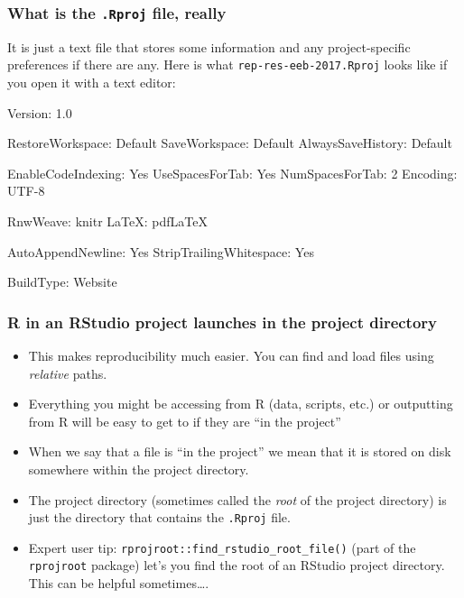 \documentclass[]{book}
\newenvironment{Shaded}{\begin{snugshade}}{\end{snugshade}}
\newcommand{\FunctionTok}[1]{\textcolor[rgb]{0.00,0.00,0.00}{{#1}}}
\newcommand{\NormalTok}[1]{{#1}}
\providecommand{\tightlist}{%
  \setlength{\itemsep}{0pt}\setlength{\parskip}{0pt}}
\theoremstyle{definition}
\theoremstyle{definition}
\theoremstyle{remark}
\begin{document}
\subsubsection{\texorpdfstring{What is the \texttt{.Rproj} file,
really}{What is the .Rproj file, really}}\label{what-is-the-.rproj-file-really}

It is just a text file that stores some information and any
project-specific preferences if there are any. Here is what
\texttt{rep-res-eeb-2017.Rproj} looks like if you open it with a text
editor:

\begin{Shaded}
\begin{Highlighting}[]
\FunctionTok{Version:} \NormalTok{1.0}

\FunctionTok{RestoreWorkspace:} \NormalTok{Default}
\FunctionTok{SaveWorkspace:} \NormalTok{Default}
\FunctionTok{AlwaysSaveHistory:} \NormalTok{Default}

\FunctionTok{EnableCodeIndexing:} \NormalTok{Yes}
\FunctionTok{UseSpacesForTab:} \NormalTok{Yes}
\FunctionTok{NumSpacesForTab:} \NormalTok{2}
\FunctionTok{Encoding:} \NormalTok{UTF-8}

\FunctionTok{RnwWeave:} \NormalTok{knitr}
\FunctionTok{LaTeX:} \NormalTok{pdfLaTeX}

\FunctionTok{AutoAppendNewline:} \NormalTok{Yes}
\FunctionTok{StripTrailingWhitespace:} \NormalTok{Yes}

\FunctionTok{BuildType:} \NormalTok{Website}
\end{Highlighting}
\end{Shaded}

\subsubsection{R in an RStudio project launches in the project
directory}\label{r-in-an-rstudio-project-launches-in-the-project-directory}

\begin{itemize}
\tightlist
\item
  This makes reproducibility much easier. You can find and load files
  using \emph{relative} paths.\\
\item
  Everything you might be accessing from R (data, scripts, etc.) or
  outputting from R will be easy to get to if they are ``in the
  project''
\item
  When we say that a file is ``in the project'' we mean that it is
  stored on disk somewhere within the project directory.
\item
  The project directory (sometimes called the \emph{root} of the project
  directory) is just the directory that contains the \texttt{.Rproj}
  file.
\item
  Expert user tip: \texttt{rprojroot::find\_rstudio\_root\_file()} (part
  of the \texttt{rprojroot} package) let's you find the root of an
  RStudio project directory. This can be helpful sometimes\ldots{}.
\end{itemize}
\end{document}
